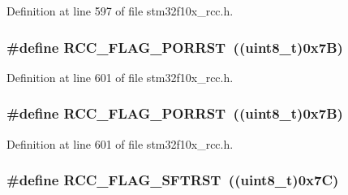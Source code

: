 Definition at line 597 of file stm32f10x\+\_\+rcc.\+h.

\subsubsection[{\texorpdfstring{R\+C\+C\+\_\+\+F\+L\+A\+G\+\_\+\+P\+O\+R\+R\+ST}{RCC_FLAG_PORRST}}]{\setlength{\rightskip}{0pt plus 5cm}\#define R\+C\+C\+\_\+\+F\+L\+A\+G\+\_\+\+P\+O\+R\+R\+ST~(({\bf uint8\+\_\+t})0x7\+B)}\hypertarget{group___r_c_c___flag_ga39ad309070f416720207eece5da7dc2c}{}\label{group___r_c_c___flag_ga39ad309070f416720207eece5da7dc2c}


Definition at line 601 of file stm32f10x\+\_\+rcc.\+h.

\subsubsection[{\texorpdfstring{R\+C\+C\+\_\+\+F\+L\+A\+G\+\_\+\+P\+O\+R\+R\+ST}{RCC_FLAG_PORRST}}]{\setlength{\rightskip}{0pt plus 5cm}\#define R\+C\+C\+\_\+\+F\+L\+A\+G\+\_\+\+P\+O\+R\+R\+ST~(({\bf uint8\+\_\+t})0x7\+B)}\hypertarget{group___r_c_c___flag_ga39ad309070f416720207eece5da7dc2c}{}\label{group___r_c_c___flag_ga39ad309070f416720207eece5da7dc2c}


Definition at line 601 of file stm32f10x\+\_\+rcc.\+h.

\subsubsection[{\texorpdfstring{R\+C\+C\+\_\+\+F\+L\+A\+G\+\_\+\+S\+F\+T\+R\+ST}{RCC_FLAG_SFTRST}}]{\setlength{\rightskip}{0pt plus 5cm}\#define R\+C\+C\+\_\+\+F\+L\+A\+G\+\_\+\+S\+F\+T\+R\+ST~(({\bf uint8\+\_\+t})0x7\+C)}\hypertarget{group___r_c_c___flag_gaf7852615e9b19f0b2dbc8d08c7594b52}{}\label{group___r_c_c___flag_gaf7852615e9b19f0b2dbc8d08c7594b52}



